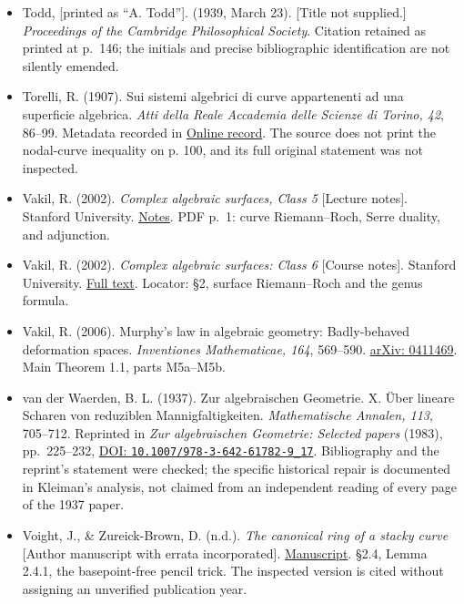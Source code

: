 \begin{sloppypar}
\begin{itemize}
\item Todd, {[}printed as ``A. Todd''{]}. (1939, March 23). {[}Title not supplied.{]} \emph{Proceedings of the Cambridge Philosophical Society}. Citation retained as printed at p.~146; the initials and precise bibliographic identification are not silently emended.

\item Torelli, R. (1907). Sui sistemi algebrici di curve appartenenti ad una superficie algebrica. \emph{Atti della Reale Accademia delle Scienze di Torino, 42}, 86--99. Metadata recorded in \href{https://www.mat.uniroma3.it/users/sernesi/BIBLIOGRAFIA/torelli.htm}{Online record}. The source does not print the nodal-curve inequality on p. 100, and its full original statement was not inspected.

\item Vakil, R. (2002). \emph{Complex algebraic surfaces, Class 5} {[}Lecture notes{]}. Stanford University. \href{https://math.stanford.edu/~vakil/02-245/sclass5A.pdf}{Notes}. PDF p.~1: curve Riemann--Roch, Serre duality, and adjunction.

\item Vakil, R. (2002). \emph{Complex algebraic surfaces: Class 6} {[}Course notes{]}. Stanford University. \href{https://math.stanford.edu/~vakil/02-245/sclass6A.pdf}{Full text}. Locator: §2, surface Riemann--Roch and the genus formula.

\item Vakil, R. (2006). Murphy's law in algebraic geometry: Badly-behaved deformation spaces. \emph{Inventiones Mathematicae, 164}, 569--590. \href{https://arxiv.org/abs/math/0411469}{arXiv: 0411469}. Main Theorem 1.1, parts M5a--M5b.

\item van der Waerden, B. L. (1937). Zur algebraischen Geometrie. X. Über lineare Scharen von reduziblen Mannigfaltigkeiten. \emph{Mathematische Annalen, 113}, 705--712. Reprinted in \emph{Zur algebraischen Geometrie: Selected papers} (1983), pp.~225--232, \href{https://doi.org/10.1007/978-3-642-61782-9_17}{DOI: \nolinkurl{10.1007/978-3-642-61782-9_17}}. Bibliography and the reprint's statement were checked; the specific historical repair is documented in Kleiman's analysis, not claimed from an independent reading of every page of the 1937 paper.

\item Voight, J., \& Zureick-Brown, D. (n.d.). \emph{The canonical ring of a stacky curve} {[}Author manuscript with errata incorporated{]}. \href{https://jvoight.github.io/articles/stacky-canonical-rings-final-fixederrata.pdf}{Manuscript}. §2.4, Lemma 2.4.1, the basepoint-free pencil trick. The inspected version is cited without assigning an unverified publication year.


\end{itemize}
\end{sloppypar}
